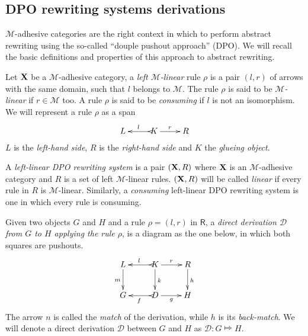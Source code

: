 \documentclass[a4paper,UKenglish,cleveref,pdftex, thm-restate,numberwithinsect]{lipics}
\def\R{\mathsf{R}}
\def\X{\textbf {\textup{X}}}
\newcommand{\dder}[1]{\mathscr{#1}}
\begin{document}
\subsection{DPO rewriting systems derivations}
$\mathcal{M}$-adhesive categories are the right context in which to perform abstract rewriting using the so-called ``douple pushout approach'' (DPO). We will recall the basic definitions and properties of this approach to abstract rewriting. 


\begin{definition}
	Let $\X$ be a $\mathcal{M}$-adhesive category, a  \emph{left $\mathcal{M}$-linear} rule $\rho$ is a pair $(l,r)$ of arrows with the same domain, such that $l$ belongs to $\mathcal{M}$.  The rule $\rho$ is said to be \emph{$\mathcal{M}$-linear} if $r\in \mathcal{M}$ too. A rule $\rho$ is said to be \emph{consuming} if $l$ is not an isomorphism. We will represent a rule $\rho$ as a span 
	\[\xymatrix{L & K\ar@{>->}[l]_{l} \ar[r]^{r} & R}\]
	$L$ is the \emph{left-hand side}, $R$ is the \emph{right-hand side} and $K$ the \emph{glueing object}. 
	
	
	A \emph{left-linear DPO rewriting system} is a pair $(\X, \R)$ where $\X$ is an $\mathcal{M}$-adhesive category and $R$ is a set of left $\mathcal{M}$-linear rules. $(\X, \R)$ will be called \emph{linear} if every rule in $R$ is $\mathcal{M}$-linear. Similarly, a \emph{consuming} left-linear DPO rewriting system is one in which every rule is consuming.
	
	Given  two objects $G$ and $H$ and a rule $\rho=(l,r)$ in $\R$, a \emph{direct derivation $\mathscr{D}$ from $G$ to $H$ applying the rule $\rho$}, is a diagram as the one below, in which both squares are pushouts. 
	\[\xymatrix{L \ar[d]_{m}& K \ar[d]^{k}\ar@{>->}[l]_{l} \ar[r]^{r} & R \ar[d]^{h}\\G & \ar@{>->}[l]^{f} D \ar[r]_{g}& H}\]
	The arrow $n$ is called the \emph{match} of the derivation, while $h$ is its \emph{back-match}.
	We will denote a direct derivation $\dder{D}$ between $G$ and $H$ as $\dder{D}\colon G\Mapsto H$. 
\end{definition}
\end{document}
